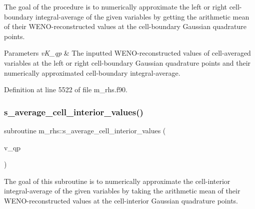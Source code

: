 The goal of the procedure is to numerically approximate the left or right cell-\/boundary integral-\/average of the given variables by getting the arithmetic mean of their W\+E\+N\+O-\/reconstructed values at the cell-\/boundary Gaussian quadrature points. 


\begin{DoxyParams}{Parameters}
{\em v\+K\+\_\+qp} & The inputted W\+E\+N\+O-\/reconstructed values of cell-\/averaged variables at the left or right cell-\/boundary Gaussian quadrature points and their numerically approximated cell-\/boundary integral-\/average. \\
\hline
\end{DoxyParams}


Definition at line 5522 of file m\+\_\+rhs.\+f90.

\mbox{\label{namespacem__rhs_ab3b720ac99f76621fd7086da9405490f}} 
\subsubsection{\texorpdfstring{s\+\_\+average\+\_\+cell\+\_\+interior\+\_\+values()}{s\_average\_cell\_interior\_values()}}
{\footnotesize\ttfamily subroutine m\+\_\+rhs\+::s\+\_\+average\+\_\+cell\+\_\+interior\+\_\+values (\begin{DoxyParamCaption}\item[{type(\hyperlink{structm__derived__types_1_1vector__field}{vector\+\_\+field}), dimension( \hyperlink{namespacem__rhs_a806c4c0942bfd830bb0b8b6276258d01}{ieta}\%beg\+:ieta\%end,                          \hyperlink{namespacem__rhs_a6b5d4a4e84fc5b93c1a13151ae398cc6}{iksi}\%beg\+:iksi\%end,                          \hyperlink{namespacem__rhs_afa742a72b96bfdbfa7d4ed2702f9d5f1}{itau}\%beg\+:itau\%end ), intent(inout)}]{v\+\_\+qp }\end{DoxyParamCaption})}



The goal of this subroutine is to numerically approximate the cell-\/interior integral-\/average of the given variables by taking the arithmetic mean of their W\+E\+N\+O-\/reconstructed values at the cell-\/interior Gaussian quadrature points. 


